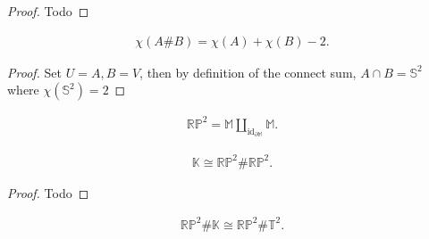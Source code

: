 \begin{proof}

Todo

\end{proof}


\begin{corollary}

\begin{align*}  
\chi(A \# B) = \chi(A) + \chi(B) - 2
.\end{align*}

\end{corollary}

\begin{proof}

Set \(U= A, B=V\), then by definition of the connect sum,
\(A\cap B = {\mathbb{S}}^2\) where \(\chi({\mathbb{S}}^2) = 2\)

\end{proof}

\begin{proposition}[Decomposing $\RP^2$]

\begin{align*}  
{\mathbb{RP}}^2 = {\mathbb{M}}{\coprod}_{\operatorname{id}_{{{\partial}}{\mathbb{M}}}} {\mathbb{M}}
.\end{align*}

\end{proposition}

\begin{proposition}

\begin{align*}  
{\mathbb{K}}\cong {\mathbb{RP}}^2 \# {\mathbb{RP}}^2
.\end{align*}

\end{proposition}

\begin{proof}

Todo

\end{proof}


\begin{proposition}

\begin{align*}  
{\mathbb{RP}}^2 \# {\mathbb{K}}\cong {\mathbb{RP}}^2 \# {\mathbb{T}}^2
.\end{align*}

\end{proposition}

